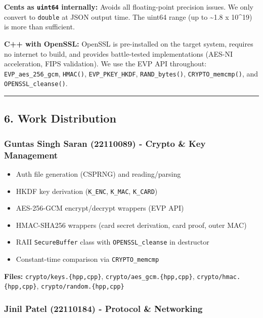 \documentclass[
]{article}
\providecommand{\tightlist}{%
  \setlength{\itemsep}{0pt}\setlength{\parskip}{0pt}}
\begin{document}
\textbf{Cents as \texttt{uint64} internally:} Avoids all floating-point
precision issues. We only convert to \texttt{double} at JSON output
time. The uint64 range (up to \textasciitilde1.8 x 10\^{}19) is more
than sufficient.

\textbf{C++ with OpenSSL:} OpenSSL is pre-installed on the target
system, requires no internet to build, and provides battle-tested
implementations (AES-NI acceleration, FIPS validation). We use the EVP
API throughout: \texttt{EVP\_aes\_256\_gcm}, \texttt{HMAC()},
\texttt{EVP\_PKEY\_HKDF}, \texttt{RAND\_bytes()},
\texttt{CRYPTO\_memcmp()}, and \texttt{OPENSSL\_cleanse()}.

\begin{center}\rule{0.5\linewidth}{0.5pt}\end{center}

\hypertarget{work-distribution}{%
\subsection{6. Work Distribution}\label{work-distribution}}

\hypertarget{guntas-singh-saran-22110089---crypto-key-management}{%
\subsubsection{Guntas Singh Saran (22110089) - Crypto \& Key
Management}\label{guntas-singh-saran-22110089---crypto-key-management}}

\begin{itemize}
\tightlist
\item
  Auth file generation (CSPRNG) and reading/parsing
\item
  HKDF key derivation (\texttt{K\_ENC}, \texttt{K\_MAC},
  \texttt{K\_CARD})
\item
  AES-256-GCM encrypt/decrypt wrappers (EVP API)
\item
  HMAC-SHA256 wrappers (card secret derivation, card proof, outer MAC)
\item
  RAII \texttt{SecureBuffer} class with \texttt{OPENSSL\_cleanse} in
  destructor
\item
  Constant-time comparison via \texttt{CRYPTO\_memcmp}
\end{itemize}

\textbf{Files:} \texttt{crypto/keys.\{hpp,cpp\}},
\texttt{crypto/aes\_gcm.\{hpp,cpp\}}, \texttt{crypto/hmac.\{hpp,cpp\}},
\texttt{crypto/random.\{hpp,cpp\}}

\hypertarget{jinil-patel-22110184---protocol-networking}{%
\subsubsection{Jinil Patel (22110184) - Protocol \&
Networking}\label{jinil-patel-22110184---protocol-networking}}
\end{document}
